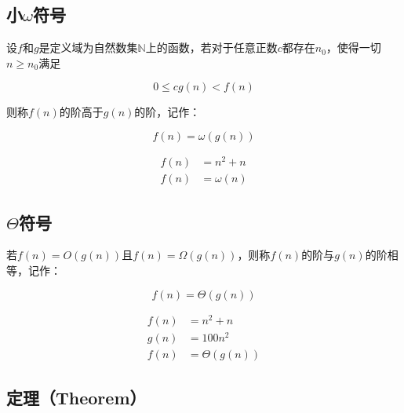 \subsection{小$ \omega $符号}

设$ f $和$ g $是定义域为自然数集$ \mathbb{N} $上的函数，若对于任意正数$ c $都存在$ n_0 $，使得一切$ n \ge n_0 $满足

\vspace{-0.5cm}

$$
	0 \le cg(n) < f(n)
$$

则称$ f(n) $的阶高于$ g(n) $的阶，记作：

\vspace{-0.5cm}

$$
	f(n) = \omega(g(n))
$$

\vspace{0.5cm}


\vspace{-1cm}

\begin{align*}
	f(n) & = n^2 + n   \\
	f(n) & = \omega(n)
\end{align*}

\vspace{0.5cm}

\subsection{$ \Theta $符号}

若$ f(n) = O(g(n)) $且$ f(n) = \Omega(g(n)) $，则称$ f(n) $的阶与$ g(n) $的阶相等，记作：

\vspace{-0.5cm}

$$
	f(n) = \Theta(g(n))
$$

\vspace{0.5cm}


\vspace{-1cm}

\begin{align*}
	f(n) & = n^2 + n      \\
	g(n) & = 100n^2       \\
	f(n) & = \Theta(g(n))
\end{align*}

\vspace{0.5cm}

\subsection{定理（Theorem）}


